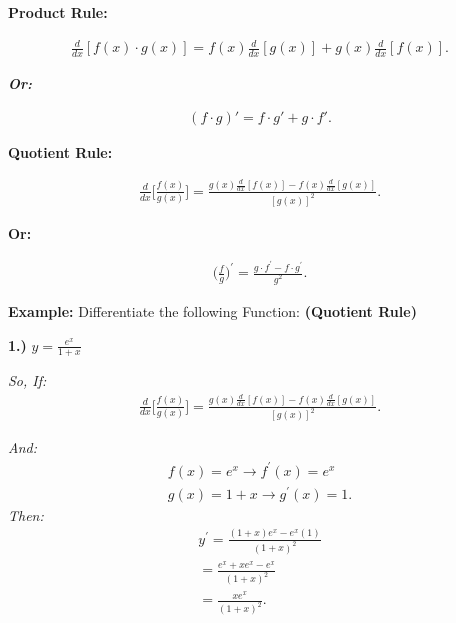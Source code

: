 \documentclass{report}
\begin{document}
  \bigbreak \noindent \bigbreak \noindent \bigbreak \noindent 
  \begin{large}
    \textbf{Product Rule:}
  \end{large}
  \begin{mdframed}
    \begin{align*}
      \frac{d}{dx}[f(x) \cdot g(x)] = f(x) \frac{d}{dx}[g(x)] + g(x) \frac{d}{dx}[f(x)]
    .\end{align*}
    \begin{center}
      \textbf{\textit{Or:}}
    \end{center}
    \begin{align*}
      (f\cdot g)\prime = f \cdot g\prime + g \cdot f\prime
    .\end{align*}
  \end{mdframed}
  \bigbreak \noindent 
  \begin{large}
    \textbf{Quotient Rule:}
  \end{large}
  \begin{mdframed}
    \begin{align*}
      \frac{d}{dx}\bigg[ \frac{f(x)}{g(x)}\bigg] = \frac{g(x) \frac{d}{dx}[f(x)] - f(x) \frac{d}{dx}[g(x)]}{[g(x)]^2}
    .\end{align*}
    \begin{center}
      \textbf{Or:}
    \end{center}
    \begin{align*}
      \bigg(\frac{f}{g}\bigg)^{\prime} = \frac{g \cdot f ^{\prime} - f \cdot g ^{\prime}}{g^2}
    .\end{align*}
  \end{mdframed}

  \bigbreak \noindent \bigbreak \noindent 
  \begin{mdframed}
    \textbf{Example:} Differentiate the following Function: \textbf{(Quotient Rule)}
  \end{mdframed}
  \bigbreak \noindent 
  \textbf{1.)} $y = \frac{e^x}{1+x}$

  \bigbreak \noindent 
  \textit{So, If:}
  \begin{align*}
    \frac{d}{dx}\bigg[ \frac{f(x)}{g(x)}\bigg] = \frac{g(x) \frac{d}{dx}[f(x)] - f(x) \frac{d}{dx}[g(x)]}{[g(x)]^2} 
  .\end{align*}

  \bigbreak \noindent 
  \textit{And:}
  \begin{align*}
    f(x) = e^x \rightarrow f ^{\prime}(x) = e^x \\ 
    g(x) = 1 + x \rightarrow g ^{\prime}(x) = 1
  .\end{align*}
  \bigbreak \noindent 
  \textit{Then:}
  \begin{align*}
    y ^{\prime} = \frac{(1+x)e^x - e^x(1)}{(1+x)^2}\\
    = \frac{e^x + xe^x - e^x}{(1+x)^2} \\ 
    = \frac{xe^x}{(1+x)^2}
  .\end{align*}
\end{document}
